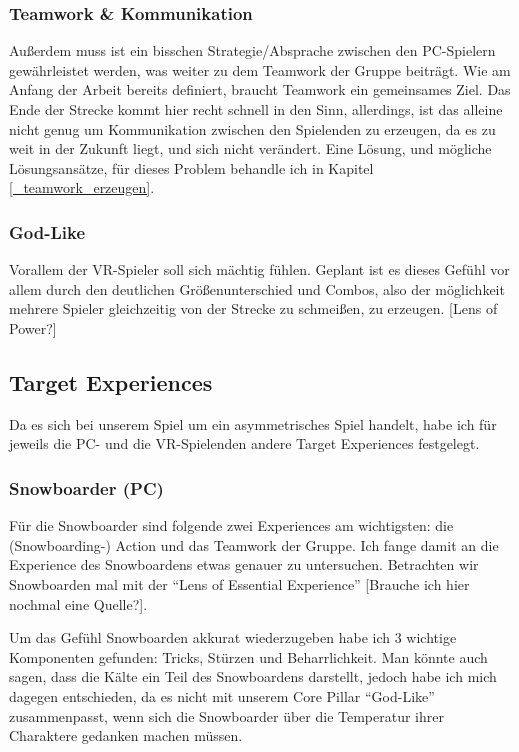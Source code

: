 \subsubsection{Teamwork \& Kommunikation}
Außerdem muss ist ein bisschen Strategie/Absprache zwischen den PC-Spielern gewährleistet werden, was weiter zu dem Teamwork der Gruppe beiträgt. Wie am Anfang der Arbeit bereits definiert, braucht Teamwork ein gemeinsames Ziel. Das Ende der Strecke kommt hier recht schnell in den Sinn, allerdings, ist das alleine nicht genug um Kommunikation zwischen den Spielenden zu erzeugen, da es zu weit in der Zukunft liegt, und sich nicht verändert. Eine Lösung, und mögliche Lösungsansätze, für dieses Problem behandle ich in Kapitel \ref{_teamwork_erzeugen}.

\subsubsection{God-Like}
Vorallem der VR-Spieler soll sich mächtig fühlen. Geplant ist es dieses Gefühl vor allem durch den deutlichen Größenunterschied und Combos, also der möglichkeit mehrere Spieler gleichzeitig von der Strecke zu schmeißen, zu erzeugen.
[Lens of Power?]

\subsection{Target Experiences}

Da es sich bei unserem Spiel um ein asymmetrisches Spiel handelt, habe ich für jeweils die PC- und die VR-Spielenden andere Target Experiences festgelegt.

\subsubsection{Snowboarder (PC)}
Für die Snowboarder sind folgende zwei Experiences am wichtigsten: die (Snowboarding-) Action und das Teamwork der Gruppe. Ich fange damit an die Experience des Snowboardens etwas genauer zu untersuchen. Betrachten wir Snowboarden mal mit der "`Lens of Essential Experience"' [Brauche ich hier nochmal eine Quelle?].

Um das Gefühl Snowboarden akkurat wiederzugeben habe ich 3 wichtige Komponenten gefunden: Tricks, Stürzen und Beharrlichkeit. Man könnte auch sagen, dass die Kälte ein Teil des Snowboardens darstellt, jedoch habe ich mich dagegen entschieden, da es nicht mit unserem Core Pillar "`God-Like"' zusammenpasst, wenn sich die Snowboarder über die Temperatur ihrer Charaktere gedanken machen müssen.

